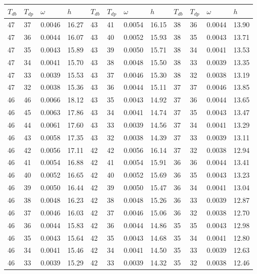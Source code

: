 \begin{tabular}{llll|llll|llll}
 \toprule 
\(T_{db}\) & \(T_{dp}\) & \(\omega\) & \(h\) & \(T_{db}\) & \(T_{dp}\) & \(\omega\) & \(h\) & \(T_{db}\) & \(T_{dp}\) & \(\omega\) & \(h\)  \\ \midrule 
47 & 37 & 0.0046 & 16.27 & 43 & 41 & 0.0054 & 16.15 & 38 & 36 & 0.0044 & 13.90\\
47 & 36 & 0.0044 & 16.07 & 43 & 40 & 0.0052 & 15.93 & 38 & 35 & 0.0043 & 13.71\\
47 & 35 & 0.0043 & 15.89 & 43 & 39 & 0.0050 & 15.71 & 38 & 34 & 0.0041 & 13.53\\
47 & 34 & 0.0041 & 15.70 & 43 & 38 & 0.0048 & 15.50 & 38 & 33 & 0.0039 & 13.35\\
47 & 33 & 0.0039 & 15.53 & 43 & 37 & 0.0046 & 15.30 & 38 & 32 & 0.0038 & 13.19\\
47 & 32 & 0.0038 & 15.36 & 43 & 36 & 0.0044 & 15.11 & 37 & 37 & 0.0046 & 13.85\\
46 & 46 & 0.0066 & 18.12 & 43 & 35 & 0.0043 & 14.92 & 37 & 36 & 0.0044 & 13.65\\
46 & 45 & 0.0063 & 17.86 & 43 & 34 & 0.0041 & 14.74 & 37 & 35 & 0.0043 & 13.47\\
46 & 44 & 0.0061 & 17.60 & 43 & 33 & 0.0039 & 14.56 & 37 & 34 & 0.0041 & 13.29\\
46 & 43 & 0.0058 & 17.35 & 43 & 32 & 0.0038 & 14.39 & 37 & 33 & 0.0039 & 13.11\\
46 & 42 & 0.0056 & 17.11 & 42 & 42 & 0.0056 & 16.14 & 37 & 32 & 0.0038 & 12.94\\
46 & 41 & 0.0054 & 16.88 & 42 & 41 & 0.0054 & 15.91 & 36 & 36 & 0.0044 & 13.41\\
46 & 40 & 0.0052 & 16.65 & 42 & 40 & 0.0052 & 15.69 & 36 & 35 & 0.0043 & 13.23\\
46 & 39 & 0.0050 & 16.44 & 42 & 39 & 0.0050 & 15.47 & 36 & 34 & 0.0041 & 13.04\\
46 & 38 & 0.0048 & 16.23 & 42 & 38 & 0.0048 & 15.26 & 36 & 33 & 0.0039 & 12.87\\
46 & 37 & 0.0046 & 16.03 & 42 & 37 & 0.0046 & 15.06 & 36 & 32 & 0.0038 & 12.70\\
46 & 36 & 0.0044 & 15.83 & 42 & 36 & 0.0044 & 14.86 & 35 & 35 & 0.0043 & 12.98\\
46 & 35 & 0.0043 & 15.64 & 42 & 35 & 0.0043 & 14.68 & 35 & 34 & 0.0041 & 12.80\\
46 & 34 & 0.0041 & 15.46 & 42 & 34 & 0.0041 & 14.50 & 35 & 33 & 0.0039 & 12.63\\
46 & 33 & 0.0039 & 15.29 & 42 & 33 & 0.0039 & 14.32 & 35 & 32 & 0.0038 & 12.46\\

\end{tabular}
